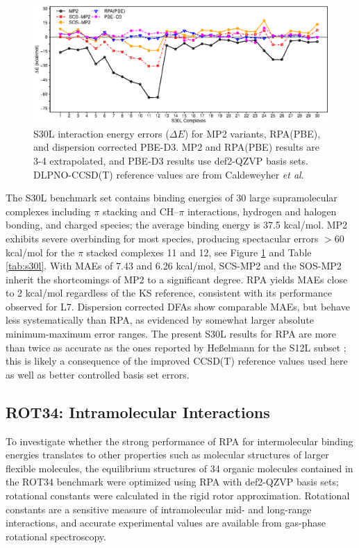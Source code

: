 \documentclass[journal=jctcce,manuscript=article]{achemso}
\begin{document}
\begin{figure}[hbpt]
  \centering
  \includegraphics{s30l_compare2.eps}
  \caption{S30L interaction energy errors ($\Delta E$) for MP2 variants,
    RPA(PBE), and dispersion corrected PBE-D3. MP2 and RPA(PBE)
    results are 3-4 extrapolated, and PBE-D3 results use def2-QZVP basis
    sets. DLPNO-CCSD(T) reference values are from
    Caldeweyher \textit{et al}.\cite{doi:10.1063/1.5090222}}
  \label{fig:theories}
\end{figure}

The S30L benchmark set contains binding energies of 30 large supramolecular
complexes including $\pi$ stacking and CH--$\pi$ interactions, hydrogen
and halogen bonding, and charged 
species; the average binding energy is 37.5
  kcal/mol.\cite{Sure15JChemTheoryComput,doi:10.1063/1.5012601} MP2 exhibits severe
overbinding for most species, producing spectacular errors 
$>60$ kcal/mol for the $\pi$ stacked complexes 11 and 12, see Figure
\ref{fig:theories} and 
Table \ref{tab:s30l}. With MAEs of 7.43 and 6.26 kcal/mol, SCS-MP2 and
the SOS-MP2 inherit the shortcomings of MP2 to a significant degree.
RPA yields MAEs close to 2 kcal/mol regardless of the KS reference,
consistent with its performance observed for L7. Dispersion corrected
DFAs show comparable MAEs, but behave less systematically than RPA, as
evidenced by somewhat larger absolute minimum-maximum error ranges. The
present S30L results for RPA are more than twice as accurate as the ones
reported by He{\ss}elmann for the S12L subset \cite{heelmann201765};
this is likely a consequence of the improved CCSD(T) reference values 
\cite{doi:10.1063/1.5090222} used here as well as better controlled basis set
errors.

\subsection{ROT34: Intramolecular Interactions}

To investigate whether the strong performance of RPA for intermolecular
binding energies translates to other properties such as molecular
structures of larger flexible molecules, the equilibrium structures of 
34 organic molecules contained in the ROT34 benchmark\cite{C3CP52293H,Risthaus14JComputChem35p1509}
were optimized using RPA with def2-QZVP basis sets;
rotational constants
were calculated in the rigid rotor approximation. Rotational constants
are a sensitive measure of intramolecular mid- and long-range
interactions, and accurate experimental values are available from
gas-phase rotational spectroscopy. \cite{C3CP52293H,Risthaus14JComputChem35p1509}
\end{document}
